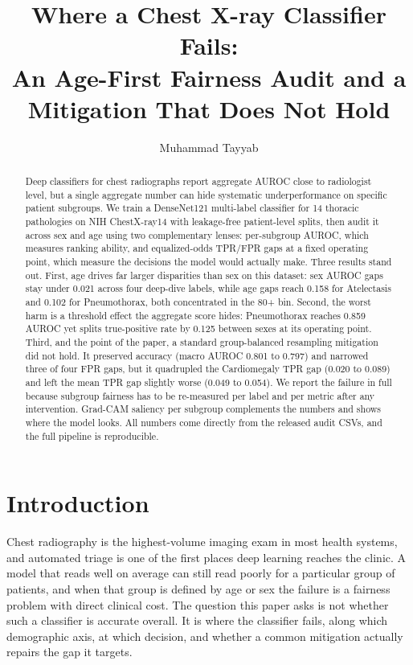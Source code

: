 \documentclass[11pt]{article}
\title{Where a Chest X-ray Classifier Fails:\\ An Age-First Fairness Audit and a Mitigation That Does Not Hold}
\author{Muhammad Tayyab}
\date{}
\begin{document}
\maketitle

\begin{abstract}
Deep classifiers for chest radiographs report aggregate AUROC close to radiologist level, but a single aggregate number can hide systematic underperformance on specific patient subgroups. We train a DenseNet121 multi-label classifier for 14 thoracic pathologies on NIH ChestX-ray14 with leakage-free patient-level splits, then audit it across sex and age using two complementary lenses: per-subgroup AUROC, which measures ranking ability, and equalized-odds TPR/FPR gaps at a fixed operating point, which measure the decisions the model would actually make. Three results stand out. First, age drives far larger disparities than sex on this dataset: sex AUROC gaps stay under 0.021 across four deep-dive labels, while age gaps reach 0.158 for Atelectasis and 0.102 for Pneumothorax, both concentrated in the 80+ bin. Second, the worst harm is a threshold effect the aggregate score hides: Pneumothorax reaches 0.859 AUROC yet splits true-positive rate by 0.125 between sexes at its operating point. Third, and the point of the paper, a standard group-balanced resampling mitigation did not hold. It preserved accuracy (macro AUROC 0.801 to 0.797) and narrowed three of four FPR gaps, but it quadrupled the Cardiomegaly TPR gap (0.020 to 0.089) and left the mean TPR gap slightly worse (0.049 to 0.054). We report the failure in full because subgroup fairness has to be re-measured per label and per metric after any intervention. Grad-CAM saliency per subgroup complements the numbers and shows where the model looks. All numbers come directly from the released audit CSVs, and the full pipeline is reproducible.
\end{abstract}

\section{Introduction}

Chest radiography is the highest-volume imaging exam in most health systems, and automated triage is one of the first places deep learning reaches the clinic. A model that reads well on average can still read poorly for a particular group of patients, and when that group is defined by age or sex the failure is a fairness problem with direct clinical cost. The question this paper asks is not whether such a classifier is accurate overall. It is where the classifier fails, along which demographic axis, at which decision, and whether a common mitigation actually repairs the gap it targets.
\end{document}
